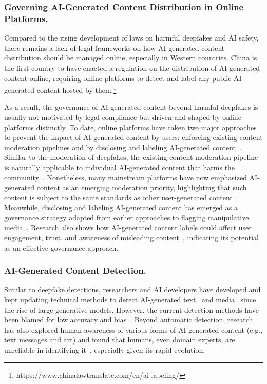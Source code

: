 \subsubsection{Governing AI-Generated Content Distribution in Online Platforms.}
Compared to the rising development of laws on harmful deepfakes and AI safety, there remains a lack of legal frameworks on how AI-generated content distribution should be managed online, especially in Western countries. China is the first country to have enacted a regulation on the distribution of AI-generated content online, requiring online platforms to detect and label any public AI-generated content hosted by them.\footnote{https://www.chinalawtranslate.com/en/ai-labeling/} 

As a result, the governance of AI-generated content beyond harmful deepfakes is usually not motivated by legal compliance but driven and shaped by online platforms distinctly. To date, online platforms have taken two major approaches to prevent the impact of AI-generated content by users: enforcing existing content moderation pipelines and by disclosing and labeling AI-generated content~\cite{gao2026governance}. Similar to the moderation of deepfakes, the existing content moderation pipeline is naturally applicable to individual AI-generated content that harms the community~\cite{fisher2024moderating}. Nonetheless, many mainstream platforms have now emphasized AI-generated content as an emerging moderation priority, highlighting that such content is subject to the same standards as other user-generated content~\cite{gao2026governance}. Meanwhile, disclosing and labeling AI-generated content has emerged as a governance strategy adapted from earlier approaches to flagging manipulative media~\cite{martel2024fact, martel2023misinformation}. Research also shows how AI-generated content labels could affect user engagement, trust, and awareness of misleading content~\cite{epstein2023label, gamage2025labeling, Wittenberg2024Labeling, jung2025ai,burrus2024unmasking, wittenberg2025labeling}, indicating its potential as an effective governance approach.


\subsubsection{AI-Generated Content Detection.}
Similar to deepfake detections, researchers and AI developers have developed and kept updating technical methods to detect AI-generated text~\cite{fraser2025detecting} and media~\cite{deng2025survey} since the rise of large generative models. However, the current detection methods have been blamed for low accuracy and bias~\cite{boutadjine2025human, weber2023testing}. Beyond automatic detection, research has also explored human awareness of various forms of AI-generated content (e.g., text messages and art) and found that humans, even domain experts, are unreliable in identifying it~\cite{boutadjine2025human, ha2024organic, lu2023seeing, zhou2023synthetic}, especially given its rapid evolution.

